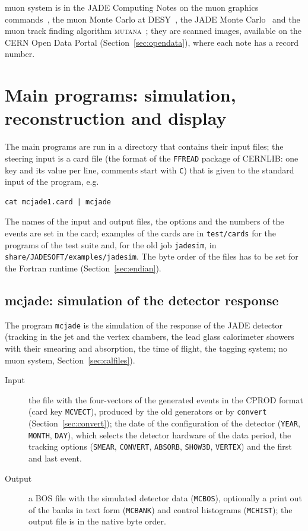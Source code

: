muon system is in the JADE Computing Notes on the muon graphics commands~\cite{JCN:52}, the muon Monte Carlo at DESY~\cite{JCN:55}, the JADE Monte Carlo~\cite{JCN:67} and the muon track finding algorithm \textsc{mutana}~\cite{JCN:82}; they are scanned images, available on the CERN Open Data Portal
(Section~\ref{sec:opendata}), where each note has a record number.


\section{Main programs: simulation, reconstruction and display}
\label{sec:programs}

The main programs are run in a directory that contains their input files; the steering input is a card file
(the format of the \texttt{FFREAD} package of CERNLIB: one key and its value per line, comments start with \texttt{C}) that
is given to the standard input of the program, e.g.
\begin{lstlisting}
cat mcjade1.card | mcjade
\end{lstlisting}
The names of the input and
output files, the options and the numbers of the events are set in the card; examples of the cards are in
\texttt{test/cards} for the programs of the test suite and, for the old job \texttt{jadesim}, in \texttt{share/\allowbreak{}JADESOFT/\allowbreak{}examples/\allowbreak{}jadesim}. The byte order of the files has to be set for the
Fortran runtime (Section~\ref{sec:endian}).

\subsection{mcjade: simulation of the detector response}
The program \texttt{mcjade} is the simulation of the response of the JADE detector (tracking in the jet and the
vertex chambers, the lead glass calorimeter showers with their smearing and absorption, the time of flight, the
tagging system; no muon system, Section~\ref{sec:calfiles}).
\begin{description}
\item[Input] the file with the four-vectors of the generated events in the CPROD format (card key \texttt{MCVECT}),
produced by the old generators or by \texttt{convert} (Section~\ref{sec:convert}); the date of the configuration of the
detector (\texttt{YEAR}, \texttt{MONTH}, \texttt{DAY}), which selects the detector hardware of the data period, the
tracking options (\texttt{SMEAR}, \texttt{CONVERT}, \texttt{ABSORB}, \texttt{SHOW3D}, \texttt{VERTEX}) and the first and
last event.
\item[Output] a BOS file with the simulated detector data (\texttt{MCBOS}), optionally a print out of the banks in
text form (\texttt{MCBANK}) and control histograms (\texttt{MCHIST}); the output file is in the native byte order.
\end{description}

